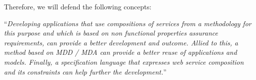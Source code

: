 \documentclass{article}
\begin{document}
Therefore, we will defend the following concepts:
 
``\textit{Developing applications that use compositions of services from a
methodology for this purpose and which is based on non functional properties
assurance requirements, can provide a better development and outcome. Allied to this, a
method based on MDD / MDA can provide a better reuse of applications and models.
Finally, a specification language that expresses web service composition and its
constraints can help further the development.}''

  
 
\end{document}

